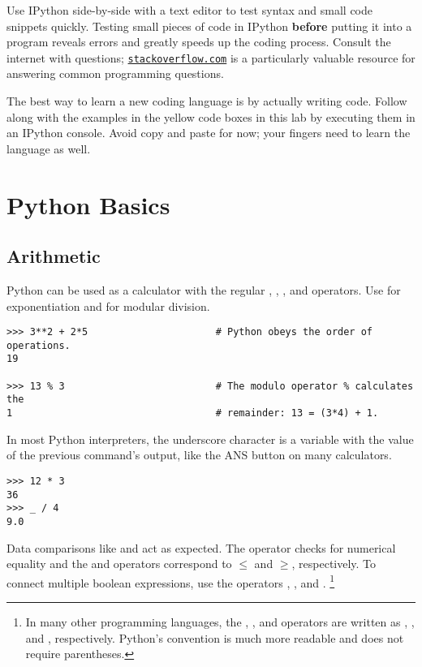 \begin{info}
Use IPython side-by-side with a text editor to test syntax and small code snippets quickly.
Testing small pieces of code in IPython \textbf{before} putting it into a program reveals errors and greatly speeds up the coding process.
Consult the internet with questions; \href{http://stackoverflow.com/}{\texttt{stackoverflow.com}} is a particularly valuable resource for answering common programming questions.

The best way to learn a new coding language is by actually writing code.
Follow along with the examples in the yellow code boxes in this lab by executing them in an IPython console.
Avoid copy and paste for now; your fingers need to learn the language as well.
\end{info}

\section*{Python Basics} %

\subsection*{Arithmetic} %

Python can be used as a calculator with the regular \li{+}, \li{-}, \li{*}, and \li{/} operators.
Use \li{**} for exponentiation and \li{\%} for modular division.

\begin{lstlisting}
>>> 3**2 + 2*5                      # Python obeys the order of operations.
19

>>> 13 % 3                          # The modulo operator % calculates the
1                                   # remainder: 13 = (3*4) + 1.
\end{lstlisting}

In most Python interpreters, the underscore character \li{\_} is a variable with the value of the previous command's output, like the ANS button on many calculators.

\begin{lstlisting}
>>> 12 * 3
36
>>> _ / 4
9.0
\end{lstlisting}

Data comparisons like \li{<} and \li{>} act as expected.
The \li{==} operator checks for numerical equality and the \li{<=} and \li{>=} operators correspond to $\le$ and $\ge$, respectively.
To connect multiple boolean expressions, use the operators , , and .%
\footnote{In many other programming languages, the , , and  operators are written as \lif{&&}, \lif{||}, and \lif{!}, respectively. Python's convention is much more readable and does not require parentheses.}

